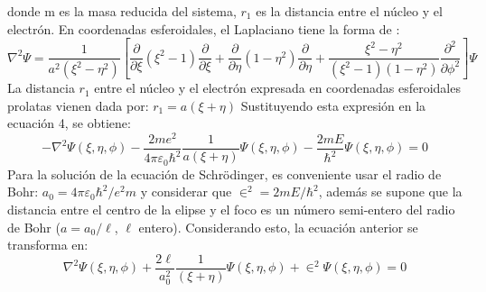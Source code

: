 \documentclass[12pt]{article}
\begin{document}
        donde m es la masa reducida del sistema, $r_{1}$
        es la distancia entre el núcleo y el electrón. 
        En coordenadas esferoidales, el Laplaciano 
        tiene la forma de \textcolor{blue}{\cite{Morse}}:
        \begin{equation}\label{Equation 5}
            \nabla^{2}\Psi = \dfrac{1}{a^{2}\left(\xi^{2}-\eta^{2}\right)}\left[\dfrac{\partial}{\partial \xi}\left(\xi^{2}-1\right)\dfrac{\partial}{\partial \xi} + \dfrac{\partial}{\partial \eta}\left(1-\eta^{2}\right)\dfrac{\partial}{\partial \eta} + \dfrac{\xi^{2}-\eta^{2}}{\left(\xi^{2}-1\right)\left(1-\eta^{2}\right)} \dfrac{\partial^{2}}{\partial \phi^{2}} \right]\Psi
        \end{equation}
        La distancia $r_{1}$ entre el núcleo y el electrón 
        expresada en coordenadas esferoidales prolatas 
        vienen dada por: $r_{1} = a\left(\xi + \eta\right)$ Sustituyendo esta expresión en la ecuación 4, se obtiene:
        \begin{equation}
            -\nabla^{2}\Psi\left(\xi,\eta,\phi\right) - \dfrac{2me^{2}}{4\pi\varepsilon_{0}\hbar^{2}}\dfrac{1}{a\left(\xi + \eta\right)}\Psi\left(\xi, \eta,\phi\right) - \dfrac{2mE}{\hbar^{2}}\Psi\left(\xi,\eta,\phi\right) = 0
        \end{equation}
        Para la solución de la ecuación de 
        Schr\"odinger, es conveniente usar el radio 
        de Bohr: $a_{0}=4\pi\varepsilon_{0}\hbar^{2}/e^{2}m$ y considerar 
        que $\in^{2} = 2mE/\hbar^{2}$, además se supone que la 
        distancia entre el centro de la elipse y el foco 
        es un número semi-entero del radio de Bohr 
        ($a = a_{0}/\ell $, $\ell$ entero). Considerando esto, la 
        ecuación anterior se transforma en:
        \begin{equation}\label{Equation 7}
            \nabla^{2}\Psi\left(\xi, \eta, \phi\right) + \dfrac{2\ell}{a_{0}^{2}}\dfrac{1}{\left(\xi + \eta\right)}\Psi\left(\xi,\eta,\phi\right) + \in^{2}\Psi\left(\xi,\eta,\phi\right) = 0
        \end{equation}
        
\end{document}
